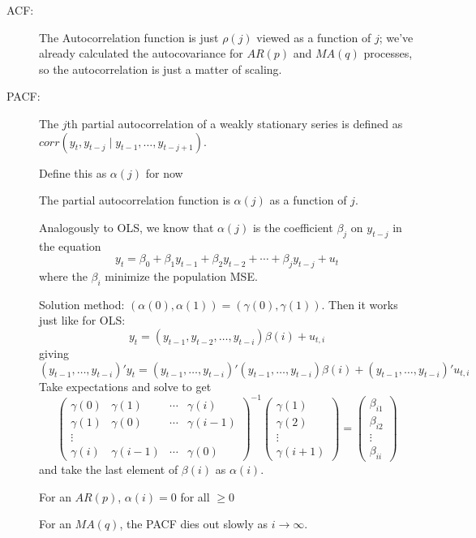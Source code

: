 \begin{description}
\item[ACF:]
  The Autocorrelation function is just $ρ(j)$ viewed as a function of
  $j$; we've already calculated the autocovariance for $AR(p)$ and
  $MA(q)$ processes, so the autocorrelation is just a matter of
  scaling.
\item[PACF:]
  The $j$th partial autocorrelation of a weakly stationary series is
  defined as $corr(y_t, y_{t-j} ∣ y_{t-1},…, y_{t-j+1})$.

  Define this as $α(j)$ for now

  The partial autocorrelation function is $α(j)$ as a function of $j$.

  Analogously to OLS, we know that $α(j)$ is the coefficient $β_j$ on
  $y_{t-j}$ in the equation
  \[y_t = β_0 + β_1 y_{t-1} + β_2 y_{t-2} + ⋯ + β_j y_{t-j} + u_t\]
  where the $β_i$ minimize the population MSE.

  Solution method: $(α(0), α(1)) = (γ(0), γ(1))$. Then it works just
  like for OLS:
  \[ y_t = ( y_{t-1}, y_{t-2},…, y_{t-i} ) β(i) + u_{t,i} \] giving
  \[( y_{t-1},…, y_{t-i} )'y_t = ( y_{t-1},…, y_{t-i} )' ( y_{t-1},…,
  y_{t-i} ) β(i) + ( y_{t-1},…, y_{t-i} )' u_{t,i}\]
  Take expectations and solve to get
  \begin{equation}
    \begin{pmatrix}
      γ(0) & γ(1) & ⋯ & γ(i) \\
      γ(1) & γ(0) & ⋯ & γ(i-1) \\
      ⋮ \\
      γ(i) & γ(i-1) & ⋯ & γ(0)
    \end{pmatrix}^{-1}
    \begin{pmatrix}
      γ(1) \\ γ(2) \\ ⋮ \\ γ(i+1)
    \end{pmatrix}
    = 
    \begin{pmatrix}
      β_{i1} \\ β_{i2} \\ ⋮ \\ β_{ii}
    \end{pmatrix}
  \end{equation}
  and take the last element of $β(i)$ as $α(i)$.

  For an $AR(p)$, $α(i) = 0$ for all $ ≥ 0$

  For an $MA(q)$, the PACF dies out slowly as $i → ∞$.
\end{description}

